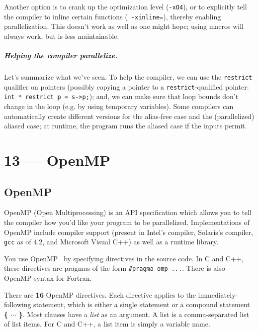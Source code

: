 \documentclass[a4paper]{report}
\begin{document}
Another option is to crank up the optimization level ({\tt -xO4}), or
to explicitly tell the compiler to inline certain functions ({\tt
  -xinline=}), thereby enabling parallelization. This doesn't work as
well as one might hope; using macros will always work, but is less maintainable.

\paragraph{Helping the compiler parallelize.} Let's summarize what we've
seen. To help the compiler, we can use the {\tt restrict} qualifier on
pointers (possibly copying a pointer to a {\tt restrict}-qualified
pointer: {\tt int * restrict p = s->p;}); and, we can make sure that
loop bounds don't change in the loop (e.g. by using temporary
variables). Some compilers can automatically create different versions
for the alias-free case and the (parallelized) aliased case; at
runtime, the program runs the aliased case if the inputs permit.









\chapter*{13 --- OpenMP}


\section*{OpenMP}


OpenMP (Open Multiprocessing) 
is an API specification which allows you to tell the compiler how you'd 
like your program to be parallelized. Implementations of OpenMP 
include compiler support (present in Intel's compiler, Solaris's 
compiler, {\tt gcc} as of 4.2, and Microsoft Visual C++) as well as a 
runtime library.

You use OpenMP~\cite{omptutorial} by specifying
directives in the source code. In C and C++, these directives are
pragmas of the form \verb+#pragma omp ...+. There is also OpenMP
syntax for Fortran. 

There are {\bf 16} OpenMP directives. Each directive applies to the immediately-following statement, which is either a single statement or a compound statement {\bf \{  $\cdots$ \}}. Most clauses have a \emph{list} as an argument. 
A list is a comma-separated list of list items. For C and C++, a list item 
is simply a variable name.
\end{document}
